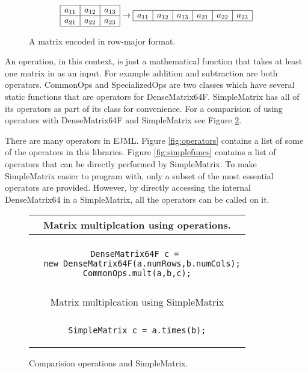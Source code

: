 \documentclass[12pt]{article}%
\begin{document}
\begin{figure}[h]
\begin{displaymath}
\begin{array}{|c|c|c|}
\hline
a_{11} & a_{12} & a_{13} \\  
\hline
a_{21} & a_{22} & a_{23} \\  
\hline
\end{array}
\rightarrow
\begin{array}{|c|c|c|c|c|c|}
\hline
a_{11} & a_{12} & a_{13} & a_{21} & a_{22} & a_{23} \\  
\hline
\end{array}
\end{displaymath}
\caption{\label{fig:rowmajor}A matrix encoded in row-major format.}
\end{figure}

An operation, in this context, is just a mathematical function that takes at least one matrix in as an input.  For example addition and subtraction are both operators.  CommonOps and SpecializedOps are two classes which have several static functions that are operators for DenseMatrix64F.  SimpleMatrix has all of its operators as part of its class for convenience.  For a comparision of using operators with DenseMatrix64F and SimpleMatrix see Figure \ref{fig:ops_vs_simple}.

There are many operators in EJML.  Figure \ref{fig:operators} contains a list of some of the operators in this libraries.  Figure \ref{fig:simplefuncs} contains a list of operators that can be directly performed by SimpleMatrix.  To make SimpleMatrix easier to program with, only a subset of the most essential operators are provided.  However, by directly accessing the internal DenseMatrix64 in a SimpleMatrix, all the operators can be called on it.

\begin{figure}[h]
\begin{center}
\begin{tabular}{c}
Matrix multiplcation using operations. \\
\hline \\
\begin{minipage}[c]{10cm}
\begin{verbatim}
DenseMatrix64F c = 
  new DenseMatrix64F(a.numRows,b.numCols);
CommonOps.mult(a,b,c);
\end{verbatim}
\end{minipage}
\\
\vspace{1cm}\\
Matrix multiplcation using SimpleMatrix \\
\hline \\
\begin{minipage}[c]{10cm}
\begin{verbatim}
SimpleMatrix c = a.times(b);
\end{verbatim}
\end{minipage}
\end{tabular}
\end{center}
\caption{\label{fig:ops_vs_simple}Comparision operations and SimpleMatrix.}
\end{figure}
\end{document}
